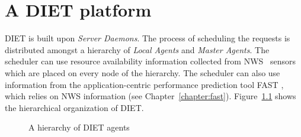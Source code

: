 
\chapter{A DIET platform}
\label{ch:description}

\textsc{DIET} is built upon \emph{Server Daemons}. The process of
scheduling the requests is distributed amongst a hierarchy of
\emph{Local Agents} and \emph{Master Agents}. The scheduler can use
resource availability information collected from NWS~\cite{WSH99}
sensors which are placed on every node of the hierarchy. The
scheduler can also use information from the application-centric
performance prediction tool \textsc{FAST} \cite{Qui02}, which relies
on NWS information (see Chapter~\ref{chapter:fast}).
Figure~\ref{fig:platform} shows the hierarchical organization of
DIET.

\begin{figure}[htb]
 \begin{center}
  \caption{\label{fig:platform}A hierarchy of DIET agents}
 \end{center}
\end{figure}

